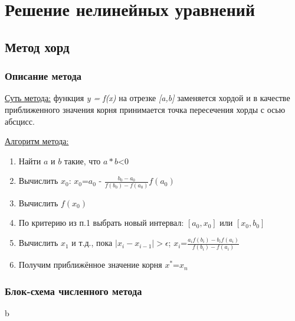 \tableofcontents

\newpage


\section{Решение нелинейных уравнений}

\subsection{Метод хорд}

\subsubsection{Описание метода}
\underline{Суть метода:} функция \textit{y = f(x)} на отрезке \textit{[a,b]} заменяется хордой и в качестве приближенного
значения корня принимается точка пересечения хорды с осью абсцисс.


\underline{Алгоритм метода:}
\begin{enumerate}
    \item Найти $a$ и $b$ такие, что $a*b$<$0$
    \item Вычислить $x_0$:  $x_0$=$a_0$ - $\frac{b_0-a_0}{f(b_0)-f(a_0)}$$f(a_0)$
    \item Вычислить $f(x_0)$
    \item По критерию из п.1 выбрать новый интервал: $[a_0,x_0]$ или $[x_0,b_0]$
    \item Вычислить $x_1$ и т.д., пока $|x_i - x_{i-1}|>\epsilon$; $x_i$=$\frac{a_{i}f(b_i)-b_{i}f(a_i)}{f(b_i)-f(a_i)}$
    \item Получим приближённое значение корня $x^*$=$x_n$
\end{enumerate}

\subsubsection{Блок-схема численного метода}
b%

